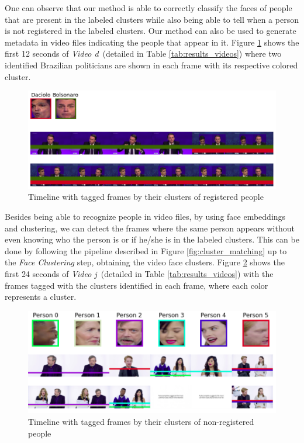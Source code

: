 One can observe that our method is able to correctly classify the faces of people that are present in the labeled clusters while also being able to tell when a person is not registered in the labeled clusters.
Our method can also be used to generate metadata in video files indicating the people that appear in it.
Figure \ref{fig:timeline_pol} shows the first 12 seconds of \emph{Video d}~(detailed in Table \ref{tab:results_videos}) where two identified Brazilian politicians are shown in each frame with its respective colored cluster.

\begin{figure}[!ht]
    \centering
    \includegraphics[width=0.6\linewidth]{img/webmedia/timeline_pol.png}
\vspace{-1em}
    \caption{Timeline with tagged frames by their clusters of registered people}
    \label{fig:timeline_pol}
\end{figure}

Besides being able to recognize people in video files, by using face embeddings and clustering, we can detect the frames where the same person appears without even knowing who the person is or if he/she is in the labeled clusters.
This can be done by following the pipeline described in Figure \ref{fig:cluster_matching} up to the \emph{Face Clustering} step, obtaining the video face clusters.
Figure \ref{fig:timeline} shows the first 24 seconds of \emph{Video j}~(detailed in Table \ref{tab:results_videos}) with the frames tagged with the clusters identified in each frame, where each color represents a cluster.

\begin{figure}[!ht]
    \centering
    \includegraphics[width=0.6\linewidth]{img/webmedia/timeline2.png}
    \caption{Timeline with tagged frames by their clusters of non-registered people}
    \label{fig:timeline}
\end{figure}